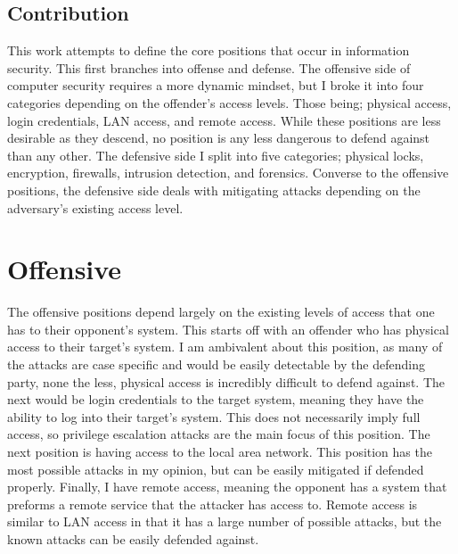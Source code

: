 \documentclass{article}
\begin{document}
\subsection{Contribution}
This work attempts to define the core positions that occur in information security. This first branches into offense and defense. The offensive side of computer security requires a more dynamic mindset, but I broke it into four categories depending on the offender's access levels. Those being; physical access, login credentials, LAN access, and remote access. While these positions are less desirable as they descend, no position is any less dangerous to defend against than any other. The defensive side I split into five categories; physical locks, encryption, firewalls, intrusion detection, and forensics. Converse to the offensive positions, the defensive side deals with mitigating attacks depending on the adversary's existing access level. \\


\section{Offensive}
The offensive positions depend largely on the existing levels of access that one has to their opponent's system. This starts off with an offender who has physical access to their target's system. I am ambivalent about this position, as many of the attacks are case specific and would be easily detectable by the defending party, none the less, physical access is incredibly difficult to defend against. The next would be login credentials to the target system, meaning they have the ability to log into their target's system. This does not necessarily imply full access, so privilege escalation attacks are the main focus of this position. The next position is having access to the local area network. This position has the most possible attacks in my opinion, but can be easily mitigated if defended properly. Finally, I have remote access, meaning the opponent has a system that preforms a remote service that the attacker has access to. Remote access is similar to LAN access in that it has a large number of possible attacks, but the known attacks can be easily defended against. \\
\end{document}
